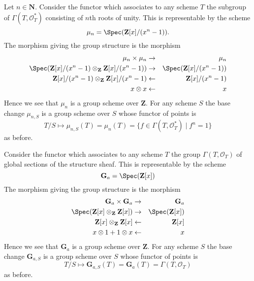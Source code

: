 \begin{example}
\label{example-roots-of-unity}
Let $n \in \mathbf{N}$.
Consider the functor which associates
to any scheme $T$ the subgroup of $\Gamma(T, \mathcal{O}_T^*)$
consisting of $n$th roots of unity.
This is representable by the scheme
$$
\mu_n = \Spec(\mathbf{Z}[x]/(x^n - 1)).
$$
The morphism giving the group structure is the morphism
\begin{eqnarray*}
\mu_n \times \mu_n & \to & \mu_n \\
\Spec(
\mathbf{Z}[x]/(x^n - 1)
\otimes_{\mathbf{Z}}
\mathbf{Z}[x]/(x^n - 1))
& \to &
\Spec(\mathbf{Z}[x]/(x^n - 1)) \\
\mathbf{Z}[x]/(x^n - 1) \otimes_{\mathbf{Z}} \mathbf{Z}[x]/(x^n - 1)
& \leftarrow &
\mathbf{Z}[x]/(x^n - 1) \\
x \otimes x & \leftarrow & x
\end{eqnarray*}
Hence we see that $\mu_n$ is a group scheme over $\mathbf{Z}$.
For any scheme $S$ the base change $\mu_{n, S}$ is a
group scheme over $S$ whose functor of points is
$$
T/S
\longmapsto
\mu_{n, S}(T) = \mu_n(T) = \{f \in \Gamma(T, \mathcal{O}_T^*) \mid f^n = 1\}
$$
as before.
\end{example}


\begin{example}
\label{example-additive-group}
Consider the functor which associates
to any scheme $T$ the group $\Gamma(T, \mathcal{O}_T)$
of global sections of the structure sheaf.
This is representable by the scheme
$$
\mathbf{G}_a = \Spec(\mathbf{Z}[x])
$$
The morphism giving the group structure is the morphism
\begin{eqnarray*}
\mathbf{G}_a \times \mathbf{G}_a & \to & \mathbf{G}_a \\
\Spec(\mathbf{Z}[x] \otimes_{\mathbf{Z}} \mathbf{Z}[x])
& \to &
\Spec(\mathbf{Z}[x]) \\
\mathbf{Z}[x] \otimes_{\mathbf{Z}} \mathbf{Z}[x]
& \leftarrow &
\mathbf{Z}[x] \\
x \otimes 1 + 1 \otimes x & \leftarrow & x
\end{eqnarray*}
Hence we see that $\mathbf{G}_a$ is a group scheme over $\mathbf{Z}$.
For any scheme $S$ the base change $\mathbf{G}_{a, S}$ is a
group scheme over $S$ whose functor of points is
$$
T/S
\longmapsto
\mathbf{G}_{a, S}(T) = \mathbf{G}_a(T) = \Gamma(T, \mathcal{O}_T)
$$
as before.
\end{example}

